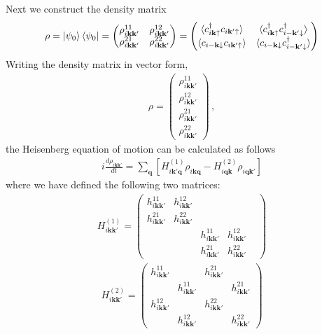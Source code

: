 \documentclass[a4paper]{article}
\begin{document}
Next we construct the density matrix
\begin{eqnarray*}
  \rho = \ket{\psi_0}\bra{\psi_0} = 
  \begin{pmatrix}
    \rho_{i\mathbf{kk'}}^{11} &
    \rho_{i\mathbf{kk'}}^{12} \\
    \rho_{i\mathbf{kk'}}^{21} &
    \rho_{i\mathbf{kk'}}^{22}
  \end{pmatrix}
  =
  \begin{pmatrix}
    \langle c_{i\mathbf{k}\uparrow }^\dagger c_{i\mathbf{k}'\uparrow }\rangle
    &
    \langle c_{i\mathbf{k}\uparrow }^\dagger c_{i-\mathbf{k}'\downarrow
    }^\dagger \rangle
    \\
    \langle 
    c_{i-\mathbf{k}\downarrow }c_{i\mathbf{k'}\uparrow }
    \rangle
    &
    \langle 
    c_{i-\mathbf{k}\downarrow }c_{i\mathbf{-k'}\downarrow }^\dagger 
    \rangle
  \end{pmatrix}
\end{eqnarray*}
Writing the density matrix in vector form,
\begin{eqnarray*}
  \rho = 
  \begin{pmatrix}
    \rho_{i\mathbf{kk'}}^{11} \\
    \rho_{i\mathbf{kk'}}^{12} \\
    \rho_{i\mathbf{kk'}}^{21} \\
    \rho_{i\mathbf{kk'}}^{22}
  \end{pmatrix} \,,
\end{eqnarray*}
the Heisenberg equation of motion can be calculated as follows
\begin{eqnarray*}
  i\frac{d \rho_{i\mathbf{k}\mathbf{k}'}}{dt}
  =
  \sum_{\mathbf{q}}^{}
  \left[ 
    H_{i\mathbf{k}' \mathbf{q}}^{(1)} \rho_{i\mathbf{kq}} -
    H_{i\mathbf{qk}}^{(2)}
    \rho_{i\mathbf{qk'}}
  \right]
\end{eqnarray*}
where we have defined the following two matrices:
\begin{eqnarray*}
  H_{i\mathbf{kk'}}^{(1)}
  =
  \begin{pmatrix}
    h_{i\mathbf{kk'}}^{11} & h_{i\mathbf{kk'}}^{12} & & \\
    h_{i\mathbf{kk'}}^{21} & h_{i\mathbf{kk'}}^{22} & & \\
    && h_{i\mathbf{kk'}}^{11} & h_{i\mathbf{kk'}}^{12} \\
    && h_{i\mathbf{kk'}}^{21} & h_{i\mathbf{kk'}}^{22} & 
  \end{pmatrix}
\end{eqnarray*}
\begin{eqnarray*}
  H_{i\mathbf{kk'}}^{(2)}
  =
  \begin{pmatrix}
    h_{i\mathbf{kk'}}^{11} && h_{i\mathbf{kk'}}^{21} & \\
    & h_{i\mathbf{kk'}}^{11} && h_{i\mathbf{kk'}}^{21} \\
    h_{i\mathbf{kk'}}^{12} && h_{i\mathbf{kk'}}^{22} & \\
    & h_{i\mathbf{kk'}}^{12} && h_{i\mathbf{kk'}}^{22}
  \end{pmatrix}
\end{eqnarray*}
\end{document}
